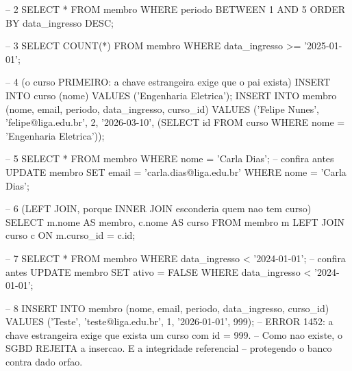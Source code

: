 \begin{apendicesenv}
\begin{sqlcode}[caption={Exercícios 1 a 3}]
-- 2
SELECT * FROM membro
WHERE periodo BETWEEN 1 AND 5
ORDER BY data_ingresso DESC;

-- 3
SELECT COUNT(*) FROM membro WHERE data_ingresso >= '2025-01-01';
\end{sqlcode}

\begin{sqlcode}[caption={Exercícios 4 e 5}]
-- 4  (o curso PRIMEIRO: a chave estrangeira exige que o pai exista)
INSERT INTO curso (nome) VALUES ('Engenharia Eletrica');
INSERT INTO membro (nome, email, periodo, data_ingresso, curso_id)
VALUES ('Felipe Nunes', 'felipe@liga.edu.br', 2, '2026-03-10',
        (SELECT id FROM curso WHERE nome = 'Engenharia Eletrica'));

-- 5
SELECT * FROM membro WHERE nome = 'Carla Dias';           -- confira antes
UPDATE membro SET email = 'carla.dias@liga.edu.br' WHERE nome = 'Carla Dias';
\end{sqlcode}

\begin{sqlcode}[caption={Exercícios 6 a 8}]
-- 6  (LEFT JOIN, porque INNER JOIN esconderia quem nao tem curso)
SELECT m.nome AS membro, c.nome AS curso
FROM   membro m LEFT JOIN curso c ON m.curso_id = c.id;

-- 7
SELECT * FROM membro WHERE data_ingresso < '2024-01-01';  -- confira antes
UPDATE membro SET ativo = FALSE WHERE data_ingresso < '2024-01-01';

-- 8
INSERT INTO membro (nome, email, periodo, data_ingresso, curso_id)
VALUES ('Teste', 'teste@liga.edu.br', 1, '2026-01-01', 999);
-- ERROR 1452: a chave estrangeira exige que exista um curso com id = 999.
-- Como nao existe, o SGBD REJEITA a insercao. E a integridade referencial
-- protegendo o banco contra dado orfao.
\end{sqlcode}

\end{apendicesenv}
